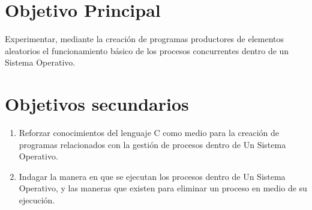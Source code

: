 \section{Objetivo Principal}
Experimentar, mediante la creación de programas productores de elementos aleatorios el funcionamiento básico de los procesos concurrentes dentro de un Sistema Operativo.

\section{Objetivos secundarios}
\begin{enumerate}
    \item Reforzar conocimientos del lenguaje C como medio para la creación de programas relacionados con la gestión de procesos dentro de Un Sistema Operativo.
    \item Indagar la manera en que se ejecutan los procesos dentro de Un Sistema Operativo, y las maneras que existen para eliminar un proceso en medio de su ejecución.
\end{enumerate}